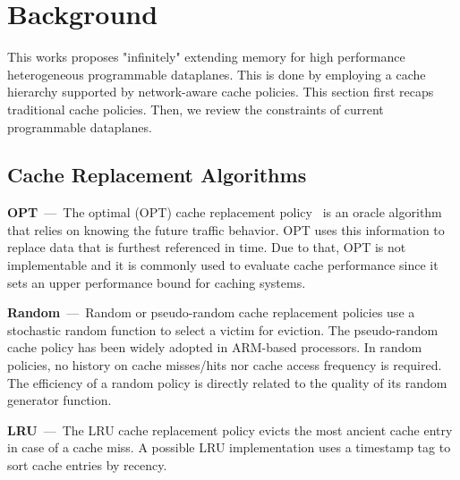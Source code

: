

\section{Background}\label{sec:back}
This works proposes "infinitely" extending memory for high performance heterogeneous programmable dataplanes.
This is done by employing a cache hierarchy supported by network-aware cache policies.
This section first recaps traditional cache policies. 
Then, we review the constraints of current programmable dataplanes.

\subsection{Cache Replacement Algorithms}
\textbf{OPT}~---~The optimal (OPT) cache replacement policy~\cite{Belady:66} is an oracle algorithm that relies on knowing the future traffic behavior.
OPT uses this information to replace data that is furthest referenced in time.
Due to that, OPT is not implementable and it is commonly used to evaluate cache performance since it sets an upper performance bound for caching systems.

\textbf{Random}~---~Random or pseudo-random cache replacement policies use a stochastic random function to select a victim for eviction.
The pseudo-random cache policy has been widely adopted in ARM-based processors.
In random policies, no history on cache misses/hits nor cache access frequency is required.
The efficiency of a random policy is directly related to the quality of its random generator function.

\textbf{LRU}~---~The LRU cache replacement policy evicts the most ancient cache entry in case of a cache miss.
A possible LRU implementation uses a timestamp tag to sort cache entries by recency.%

